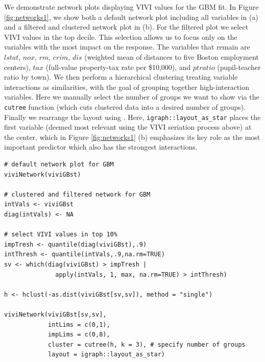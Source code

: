 We demonstrate network plots displaying VIVI values for the GBM fit. In Figure \ref{fig:networks1}, we show both a default network plot including all variables in (a) and a filtered and clustered network plot in (b). For the filtered plot we select VIVI values in the top decile. This selection allows us to focus only on the variables with the most impact on the response. The variables that remain are \(lstat\), \(nox\), \(rm\), \(crim\), \(dis\) (weighted mean of distances to five Boston employment centers), \(tax\) (full-value property-tax rate per \$10,000), and \(ptratio\) (pupil-teacher ratio by town). We then perform a hierarchical clustering treating variable interactions as similarities, with the goal of grouping together high-interaction variables. Here we manually select the number of groups we want to show via the \texttt{cutree} function (which cuts clustered data into a desired number of groups). Finally we rearrange the layout using . Here, \texttt{igraph::layout\_as\_star} places the first variable (deemed most relevant using the VIVI seriation process above) at the center, which in Figure \ref{fig:networks1} (b) emphasizes its key role as the most important predictor which also has the strongest interactions.

\begin{verbatim}
# default network plot for GBM
viviNetwork(viviGBst)

# clustered and filtered network for GBM
intVals <- viviGBst
diag(intVals) <- NA 

# select VIVI values in top 10%
impTresh <- quantile(diag(viviGBst),.9)
intThresh <- quantile(intVals,.9,na.rm=TRUE)
sv <- which(diag(viviGBst) > impTresh |
              apply(intVals, 1, max, na.rm=TRUE) > intThresh)
              
h <- hclust(-as.dist(viviGBst[sv,sv]), method = "single")

viviNetwork(viviGBst[sv,sv],
            intLims = c(0,1),
            impLims = c(0,8),
            cluster = cutree(h, k = 3), # specify number of groups
            layout = igraph::layout_as_star)
\end{verbatim}

